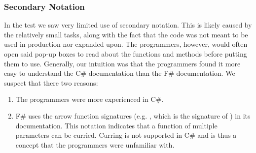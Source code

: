 \subsubsection{Secondary Notation}
In the test we saw very limited use of secondary notation. This is likely caused by the relatively small tasks, along with the fact that the code was not meant to be used in production nor expanded upon. The programmers, however, would often open said pop-up boxes to read about the functions and methods before putting them to use. Generally, our intuition was that the programmers found it more easy to understand the C\# documentation than the F\# documentation. We suspect that there two reasons:
\begin{enumerate}
    \item The programmers were more experienced in C\#.
    \item F\# uses the arrow function signatures (e.g. , which is the signature of ) in its documentation. This notation indicates that a function of multiple parameters can be curried. Curring is not supported in C\# and is thus a concept that the programmers were unfamiliar with.
\end{enumerate}